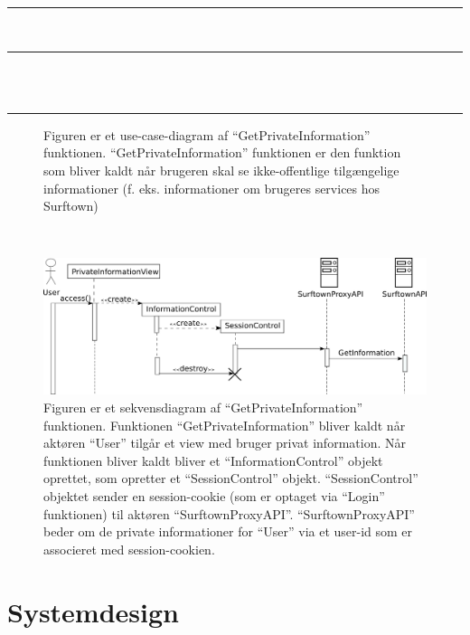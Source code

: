 \documentclass[12pt]{article}
\begin{document}
	\vspace{-10pt}
	\rule{430pt}{0.4pt}
	\\
	\rule{430pt}{0.4pt}\\
	\\
	\rule{430pt}{0.4pt}
\vspace{-30pt}
\begin{figure}[!h]
	\caption{Figuren er et use-case-diagram af ``GetPrivateInformation'' funktionen. ``GetPrivateInformation'' funktionen er den funktion som bliver kaldt når brugeren skal se ikke-offentlige tilgængelige informationer (f. eks. informationer om brugeres services hos Surftown)}
	\label{GetPrivateInformationUseCase}
\end{figure}\\
\begin{figure}
	\centering
	\includegraphics[width=13cm]{sekvens_diagrammer/GetPrivateInformation.png}
	\caption{Figuren er et sekvensdiagram af ``GetPrivateInformation'' funktionen. Funktionen ``GetPrivateInformation'' bliver kaldt når aktøren ``User'' tilgår et view med bruger privat information. Når funktionen bliver kaldt bliver et ``InformationControl'' objekt oprettet, som opretter et ``SessionControl'' objekt. ``SessionControl'' objektet sender en session-cookie (som er optaget via ``Login'' funktionen) til aktøren ``SurftownProxyAPI''. ``SurftownProxyAPI'' beder om de private informationer for ``User'' via et user-id som er associeret med session-cookien.}
	\label{fig:GetPrivateInformation}
\end{figure}
\newpage
\section{Systemdesign}
\end{document}
